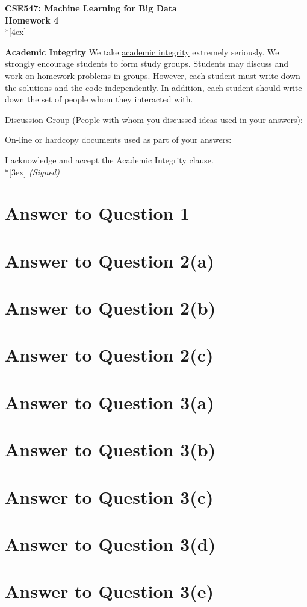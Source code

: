 \documentclass[11pt]{article}
\begin{document}
\thispagestyle{empty}
\parindent 0pt
\vfill
\large

\begin{center}
\LARGE{\bf \textsf{CSE547: Machine Learning for Big Data}}\\ {\bf \textsf{Homework 4}} 
\\*[4ex]
\end{center}

\textbf{Academic Integrity} We take \href{https://www.cs.washington.edu/academics/misconduct}{academic integrity} extremely seriously. 
We strongly encourage students to form study groups. Students may discuss and work on homework problems in groups. However, each student must write down the solutions and the code independently. In addition, each student should write down the set of people whom they interacted with. 
\bigskip

Discussion Group (People with whom you discussed ideas used in your answers): 
\vfill

On-line or hardcopy documents used as part of your answers: 
\vfill

I acknowledge and accept the Academic Integrity clause.\\*[3ex]
\bigskip
\textit{(Signed)}\hrulefill

\pagebreak[4]
\section*{Answer to Question 1}

\pagebreak[4]
\section*{Answer to Question 2(a)}

\pagebreak[4]
\section*{Answer to Question 2(b)}

\pagebreak[4]
\section*{Answer to Question 2(c)}

\pagebreak[4]
\section*{Answer to Question 3(a)}

\pagebreak[4]
\section*{Answer to Question 3(b)}

\pagebreak[4]
\section*{Answer to Question 3(c)}

\pagebreak[4]
\section*{Answer to Question 3(d)}

\pagebreak[4]
\section*{Answer to Question 3(e)}
\end{document}
